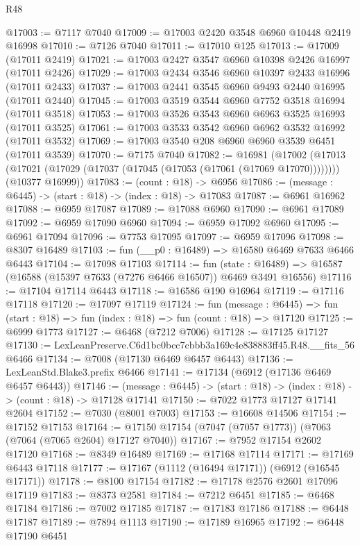 \begin{lexlean}{R48}
\begin{coremodule}
@17003 := @7117 @7040
@17009 := @17003 @2420 @3548 @6960 @10448 @2419 @16998
@17010 := @7126 @7040
@17011 := @17010 @125
@17013 := @17009 (@17011 @2419)
@17021 := @17003 @2427 @3547 @6960 @10398 @2426 @16997 (@17011 @2426)
@17029 := @17003 @2434 @3546 @6960 @10397 @2433 @16996 (@17011 @2433)
@17037 := @17003 @2441 @3545 @6960 @9493 @2440 @16995 (@17011 @2440)
@17045 := @17003 @3519 @3544 @6960 @7752 @3518 @16994 (@17011 @3518)
@17053 := @17003 @3526 @3543 @6960 @6963 @3525 @16993 (@17011 @3525)
@17061 := @17003 @3533 @3542 @6960 @6962 @3532 @16992 (@17011 @3532)
@17069 := @17003 @3540 @208 @6960 @6960 @3539 @6451 (@17011 @3539)
@17070 := @7175 @7040
@17082 := @16981
    (@17002
      (@17013 (@17021 (@17029 (@17037 (@17045 (@17053 (@17061 (@17069 @17070))))))))
      (@10377 @16999))
@17083 := (count : @18) -> @6956
@17086 := (message : @6445) -> (start : @18) -> (index : @18) -> @17083
@17087 := @6961 @16962
@17088 := @6959 @17087
@17089 := @17088 @6960
@17090 := @6961 @17089
@17092 := @6959 @17090 @6960
@17094 := @6959 @17092 @6960
@17095 := @6961 @17094
@17096 := @7753 @17095
@17097 := @6959 @17096
@17098 := @8307 @16489
@17103 := fun (__p0 : @16489) => @16580 @6469 @7633 @6466 @6443
@17104 := @17098 @17103
@17114 := fun (state : @16489) =>
  @16587 (@16588 (@15397 @7633 (@7276 @6466 @16507)) @6469 @3491 @16556)
@17116 := @17104 @17114 @6443
@17118 := @16586 @190 @16964
@17119 := @17116 @17118
@17120 := @17097 @17119
@17124 := fun (message : @6445) =>
  fun (start : @18) => fun (index : @18) => fun (count : @18) => @17120
@17125 := @6999 @1773
@17127 := @6468 (@7212 @7006)
@17128 := @17125 @17127
@17130 := LexLeanPreserve.C6d1bc0bcc7cbbb3a169c4e838883ff45.R48.__fits_56 @6466
@17134 := @7008 (@17130 @6469 @6457 @6443)
@17136 := LexLeanStd.Blake3.prefix @6466
@17141 := @17134 (@6912 (@17136 @6469 @6457 @6443))
@17146 := (message : @6445) -> (start : @18) -> (index : @18) -> (count : @18) -> @17128 @17141
@17150 := @7022 @1773 @17127 @17141 @2604
@17152 := @7030 (@8001 @7003)
@17153 := @16608 @14506
@17154 := @17152 @17153
@17164 := @17150 @17154 (@7047 (@7057 @1773)) (@7063 (@7064 (@7065 @2604) @17127 @7040))
@17167 := @7952 @17154 @2602 @17120
@17168 := @8349 @16489
@17169 := @17168 @17114
@17171 := @17169 @6443 @17118
@17177 := @17167 (@1112 (@16494 @17171)) (@6912 (@16545 @17171))
@17178 := @8100 @17154
@17182 := @17178 @2576 @2601 @17096 @17119
@17183 := @8373 @2581
@17184 := @7212 @6451
@17185 := @6468 @17184
@17186 := @7002 @17185
@17187 := @17183 @17186
@17188 := @6448 @17187
@17189 := @7894 @1113
@17190 := @17189 @16965
@17192 := @6448 @17190 @6451

\end{coremodule}
\end{lexlean}
